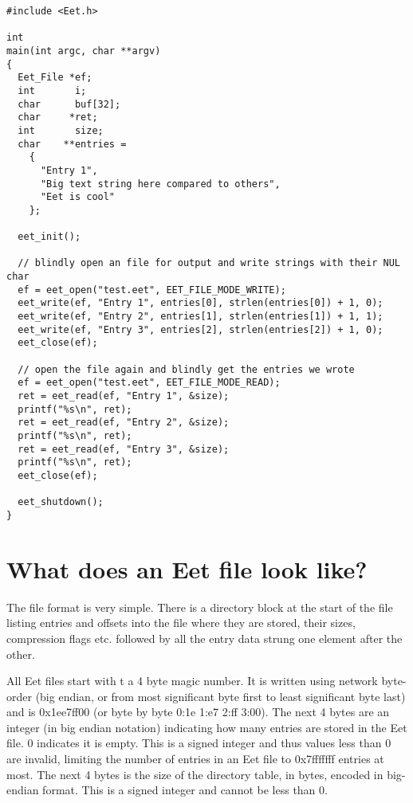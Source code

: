 \begin{Code}\begin{verbatim}#include <Eet.h>

int
main(int argc, char **argv)
{
  Eet_File *ef;
  int       i;
  char      buf[32];
  char     *ret;
  int       size;
  char    **entries =
    {
      "Entry 1",
      "Big text string here compared to others",
      "Eet is cool"
    };

  eet_init();

  // blindly open an file for output and write strings with their NUL char
  ef = eet_open("test.eet", EET_FILE_MODE_WRITE);
  eet_write(ef, "Entry 1", entries[0], strlen(entries[0]) + 1, 0);
  eet_write(ef, "Entry 2", entries[1], strlen(entries[1]) + 1, 1);
  eet_write(ef, "Entry 3", entries[2], strlen(entries[2]) + 1, 0);
  eet_close(ef);

  // open the file again and blindly get the entries we wrote
  ef = eet_open("test.eet", EET_FILE_MODE_READ);
  ret = eet_read(ef, "Entry 1", &size);
  printf("%s\n", ret);
  ret = eet_read(ef, "Entry 2", &size);
  printf("%s\n", ret);
  ret = eet_read(ef, "Entry 3", &size);
  printf("%s\n", ret);
  eet_close(ef);

  eet_shutdown();
}
\end{verbatim}
\end{Code}

\hypertarget{index_format}{}\section{What does an Eet file look like?}\label{index_format}
The file format is very simple. There is a directory block at the start of the file listing entries and offsets into the file where they are stored, their sizes, compression flags etc. followed by all the entry data strung one element after the other.

All Eet files start with t a 4 byte magic number. It is written using network byte-order (big endian, or from most significant byte first to least significant byte last) and is 0x1ee7ff00 (or byte by byte 0:1e 1:e7 2:ff 3:00). The next 4 bytes are an integer (in big endian notation) indicating how many entries are stored in the Eet file. 0 indicates it is empty. This is a signed integer and thus values less than 0 are invalid, limiting the number of entries in an Eet file to 0x7fffffff entries at most. The next 4 bytes is the size of the directory table, in bytes, encoded in big-endian format. This is a signed integer and cannot be less than 0.

